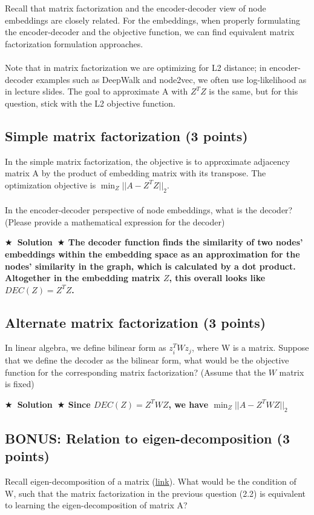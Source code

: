 \documentclass{article}
\numberwithin{figure}{section}
\newcommand{\Solution}[1]{{\medskip \color{red} \bf $\bigstar$~\sf \textbf{Solution}~$\bigstar$ \sf #1 } \bigskip}
\begin{document}
Recall that matrix factorization and the encoder-decoder view of node embeddings are closely related. For the embeddings, when properly formulating the encoder-decoder and the objective function, we can find equivalent matrix factorization formulation approaches.\\
\\
    Note that in matrix factorization we are optimizing for L2 distance; in encoder-decoder examples such as DeepWalk and node2vec, we often use log-likelihood as in lecture slides. The goal to approximate A with $Z^TZ$ is the same, but for this question, stick with the L2 objective function.


\subsection{Simple matrix factorization (3 points)}
In the simple matrix factorization, the objective is to approximate adjacency matrix A by the product of embedding matrix with its transpose. The optimization objective is $\min_Z ||A - Z^TZ||_2$.\\
\\
In the encoder-decoder perspective of node embeddings, what is the decoder? (Please provide a mathematical expression for the decoder)

\Solution{The decoder function finds the similarity of two nodes' embeddings within the embedding space 
as an approximation for the nodes' similarity in the graph, which is calculated by a dot product. Altogether in the embedding matrix $Z$, this overall 
looks like $DEC(Z) = Z^{T}Z $.}



\subsection{Alternate matrix factorization (3 points)}
In linear algebra, we define bilinear form as $z_i^T W z_j$, where W is a matrix. Suppose that we define the decoder as the bilinear form, what would be the objective function for the corresponding matrix factorization? (Assume that the $W$ matrix is fixed)

\Solution{Since $DEC(Z) = Z^{T}WZ $, we have $\min_Z ||A - Z^{T}WZ||_2$}



\subsection{BONUS: Relation to eigen-decomposition (3 points)}
Recall eigen-decomposition of a matrix (\href{https://en.wikipedia.org/wiki/Eigendecomposition_of_a_matrix}{link}). What would be the condition of W, such that the matrix factorization in the previous question (2.2) is equivalent to learning the eigen-decomposition of matrix A?
\end{document}
